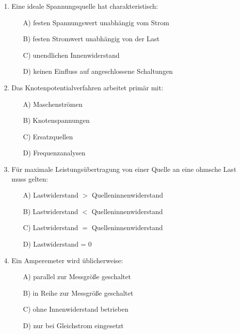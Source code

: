 \documentclass[a4paper,12pt]{article}
\newif\ifshowsolutions
\begin{document}
\begin{enumerate}[label=\textbf{\arabic*.}, leftmargin=*, itemsep=8pt]
\ifshowsolutions
Lösung: B
\fi

  \item Eine ideale Spannungsquelle hat charakteristisch:
    \begin{itemize}[label=$\square$]
      \item[A)] festen Spannungswert unabhängig vom Strom
      \item[B)] festen Stromwert unabhängig von der Last
      \item[C)] unendlichen Innenwiderstand
      \item[D)] keinen Einfluss auf angeschlossene Schaltungen
    \end{itemize}

\ifshowsolutions
Lösung: A
\fi

  \item Das Knotenpotentialverfahren arbeitet primär mit:
    \begin{itemize}[label=$\square$]
      \item[A)] Maschenströmen
      \item[B)] Knotenspannungen
      \item[C)] Ersatzquellen
      \item[D)] Frequenzanalysen
    \end{itemize}

\ifshowsolutions
Lösung: B
\fi

  \item Für maximale Leistungsübertragung von einer Quelle an eine ohmsche Last muss gelten:
    \begin{itemize}[label=$\square$]
      \item[A)] Lastwiderstand $>$ Quelleninnenwiderstand
      \item[B)] Lastwiderstand $<$ Quelleninnenwiderstand
      \item[C)] Lastwiderstand $=$ Quelleninnenwiderstand
      \item[D)] Lastwiderstand = 0
    \end{itemize}

\ifshowsolutions
Lösung: C
\fi

  \item Ein Amperemeter wird üblicherweise:
    \begin{itemize}[label=$\square$]
      \item[A)] parallel zur Messgröße geschaltet
      \item[B)] in Reihe zur Messgröße geschaltet
      \item[C)] ohne Innenwiderstand betrieben
      \item[D)] nur bei Gleichstrom eingesetzt
    \end{itemize}


\end{enumerate}
\end{document}
